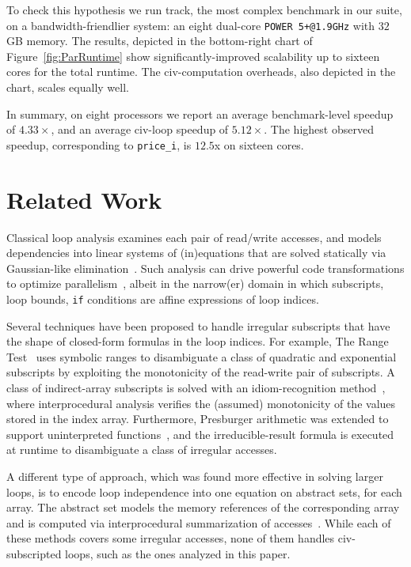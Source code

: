 \documentclass{sig-alternate}
\begin{document}
To check this hypothesis we run {\sc track}, the most complex benchmark in our suite, 
on a bandwidth-friendlier system: an eight dual-core {\tt POWER 5+@1.9GHz} with $32$GB memory. 
The results, depicted in the bottom-right chart of Figure~\ref{fig:ParRuntime} show 
significantly-improved scalability up to sixteen cores for the total runtime. 
The {\sc civ}-computation overheads, also depicted in the chart, scales equally well.  
 
In summary, on eight processors we report an average benchmark-level
speedup of $4.33\times$, and an average {\sc civ}-loop speedup of $5.12\times$. 
The highest observed speedup, corresponding to {\tt price\_i}, is $12.5$x 
on sixteen cores.


\section{Related Work} 
\label{sec:RelWork}

Classical loop analysis examines each pair of read/write accesses, %
and models dependencies into linear systems of (in)equations that are solved
statically  via Gaussian-like elimination~\cite{BanerjeeIneqTest,FeautrierDataflow}. %
Such analysis  can drive powerful code transformations to optimize 
parallelism~\cite{PolyhedralOpt}, albeit in the narrow(er) domain 
in which subscripts, loop bounds, {\tt if} conditions are affine 
expressions of loop indices.

Several techniques have been proposed to handle irregular subscripts that have
the shape of closed-form formulas in the loop indices. For example, 
The Range Test~\cite{Blume94RangeTest} uses symbolic 
ranges to disambiguate a class of quadratic and  
exponential subscripts by exploiting the monotonicity of the read-write pair 
of subscripts.   A class of indirect-array subscripts is solved with 
an idiom-recognition method~\cite{PaduaDemDrInterproc}, where interprocedural 
analysis verifies the (assumed) monotonicity of the values stored in the 
index array.
%
Furthermore, Presburger arithmetic was extended to support
uninterpreted functions~\cite{Pugh98NonlinPresb}, and the irreducible-result
formula is executed at runtime to disambiguate a class of irregular
accesses. 

A different type of approach, which was found more effective in
solving larger loops, is to encode loop independence into one equation 
on abstract sets, for each array. The abstract set models the
memory references of the corresponding array and is computed 
via interprocedural summarization of 
accesses~\cite{SUIF,Moon99PredArrDataFlow,SummaryMonot,LMAD}.
While each of these methods covers some irregular accesses,
none of them handles {\sc civ}-subscripted loops,   
such as the ones analyzed in this paper.
%
\end{document}
